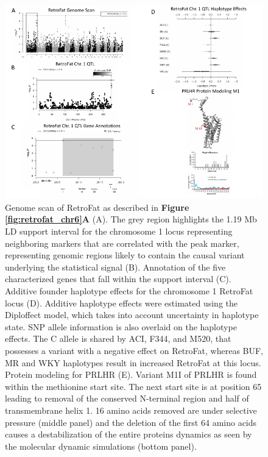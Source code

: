 \begin{figure}
\centering
\includegraphics[trim={0in 0in 0in 0in}, clip, width=\textwidth]{figures/5-hsrats/Figure6-alt.pdf}
\caption[RetroFat chromosome 1 QTL and subsequent fine-mapping analyses]{Genome scan of RetroFat as described in \textbf{Figure \ref{fig:retrofat_chr6}A} (A). The grey region highlights the 1.19 Mb LD support interval for the chromosome 1 locus representing neighboring markers that are correlated with the peak marker, representing genomic regions likely to contain the causal variant underlying the statistical signal (B). Annotation of the five characterized genes that fall within the support interval (C). Additive founder haplotype effects for the chromosome 1 RetroFat locus (D). Additive haplotype effects were estimated using the Diploffect model, which takes into account uncertainty in haplotype state. SNP allele information is also overlaid on the haplotype effects. The C allele is shared by ACI, F344, and M520, that possesses a variant with a negative effect on RetroFat, whereas BUF, MR and WKY haplotypes result in increased RetroFat at this locus. Protein modeling for PRLHR (E).  Variant M1I of PRLHR is found within the methionine start site. The next start site is at position 65 leading to removal of the conserved N-terminal region and half of transmembrane helix 1. 16 amino acids removed are under selective pressure (middle panel) and the deletion of the first 64 amino acids causes a destabilization of the entire proteins dynamics as seen by the molecular dynamic simulations (bottom panel). \label{fig:retrofat_chr1}}
\end{figure}

